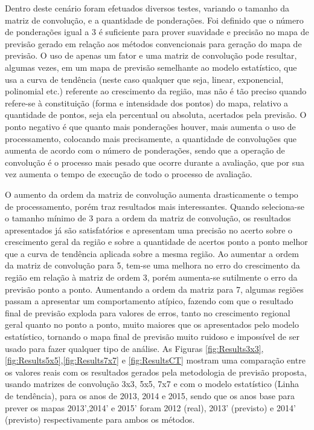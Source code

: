 Dentro deste cenário foram efetuados diversos testes, variando o tamanho da matriz de convolução, e a quantidade de ponderações. Foi definido que o número de ponderações igual a 3 é suficiente para prover suavidade e precisão no mapa de previsão gerado em relação aos métodos convencionais para geração do mapa de previsão. O uso de apenas um fator e uma matriz de convolução pode resultar, algumas vezes, em um mapa de previsão semelhante ao modelo estatístico, que usa a curva de tendência (neste caso qualquer que seja, linear, exponencial, polinomial etc.) referente ao crescimento da região, mas não é tão preciso quando refere-se à constituição (forma e intensidade dos pontos) do mapa, relativo a quantidade de pontos, seja ela percentual ou absoluta, acertados pela previsão. O ponto negativo é que quanto mais ponderações houver, mais aumenta o uso de processamento, colocando mais precisamente, a quantidade de convoluções que aumenta de acordo com o número de ponderações, sendo que a operação de convolução é o processo mais pesado que ocorre durante a avaliação, que por sua vez aumenta o tempo de execução de todo o processo de avaliação.

O aumento da ordem da matriz de convolução aumenta drasticamente o tempo de processamento, porém traz resultados mais interessantes. Quando seleciona-se o tamanho mínimo de 3 para a ordem da matriz de convolução, os resultados apresentados já são satisfatórios e apresentam uma precisão no acerto sobre o crescimento geral da região e sobre a quantidade de acertos ponto a ponto melhor que a curva de tendência aplicada sobre a mesma região. Ao aumentar a ordem da matriz de convolução para 5, tem-se uma melhora no erro do crescimento da região em relação à matriz de ordem 3, porém aumenta-se sutilmente o erro da previsão ponto a ponto. Aumentando a ordem da matriz para 7, algumas regiões passam a apresentar um comportamento atípico, fazendo com que o resultado final de previsão exploda para valores de erros, tanto no crescimento regional geral quanto no ponto a ponto, muito maiores que os apresentados pelo modelo estatístico, tornando o mapa final de previsão muito ruidoso e impossível de ser usado para fazer qualquer tipo de análise. As Figuras \ref{fig:Results3x3},\ref{fig:Results5x5},\ref{fig:Results7x7} e \ref{fig:ResultsCT} mostram uma comparação entre os valores reais com os resultados gerados pela metodologia de previsão proposta, usando matrizes de convolução 3x3, 5x5, 7x7 e com o modelo estatístico (Linha de tendência), para os anos de 2013, 2014 e 2015, sendo que os anos base para prever os mapas 2013',2014' e 2015' foram 2012 (real), 2013' (previsto) e 2014' (previsto) respectivamente para ambos os métodos.

